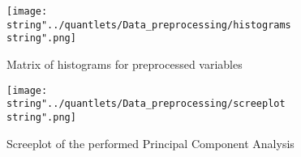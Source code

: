  
\begin{figure}[H]
  \centering
\texttt{[image: \\string"../quantlets/Data\_preprocessing/histograms\\string".png]}
  \caption{Matrix of histograms for preprocessed variables}\label{fig:hist}
\end{figure}


\begin{figure}[H]
  \centering
\texttt{[image: \\string"../quantlets/Data\_preprocessing/screeplot\\string".png]}
  \caption{Screeplot of the performed Principal Component Analysis}\label{fig:scree}
\end{figure}



 



